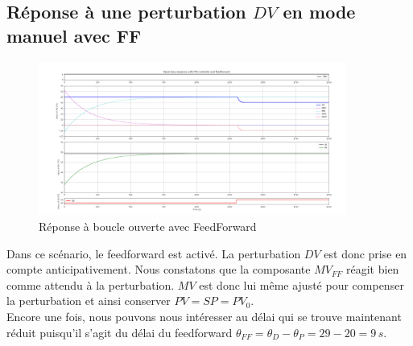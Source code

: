 \subsection{Réponse à une perturbation \texorpdfstring{$DV$}{DV} en mode manuel avec FF}
\begin{figure}[H]
    \centering
    \includegraphics[width=0.9\textwidth]{../Plots/Simulation_scenario_3.png}
    \caption{Réponse à boucle ouverte avec FeedForward}
    \label{fig:Simulation_OLP_FF}
\end{figure}
Dans ce scénario, le feedforward est activé. La perturbation $DV$ est donc prise en compte anticipativement.
Nous constatons que la composante $MV_{FF}$ réagit bien comme attendu à la perturbation. $MV$ est donc lui même ajusté pour compenser la perturbation et ainsi conserver $PV = SP = PV_0$.\\
Encore une fois, nous pouvons nous intéresser au délai qui se trouve maintenant réduit puisqu'il s'agit du délai du feedforward $\theta_{FF} = \theta_D - \theta_P = 29 - 20 = 9\,s$.

